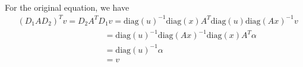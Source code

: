 \paragraph{}
For the original equation, we have
\begin{align*}
&(D_1AD_2)^Tv = D_2A^TD_1v = \text{diag}(u)^{-1}\text{diag}(x)A^T\text{diag}(u)\text{diag}(Ax)^{-1}v\\
&\qquad \qquad \qquad \qquad \qquad \ \ =\text{diag}(u)^{-1}\text{diag}(Ax)^{-1}\text{diag}(x)A^T \alpha \\
&\qquad \qquad \qquad \qquad \qquad \ \ = \text{diag}(u)^{-1} \alpha \\
&\qquad \qquad \qquad \qquad \qquad \ \ = v
\end{align*}